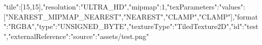 {"tile":[15,15],"resolution":"ULTRA_HD","mipmap":1,"texParameters":{"values":["NEAREST_MIPMAP_NEAREST","NEAREST","CLAMP","CLAMP"]},"format":"RGBA","type":"UNSIGNED_BYTE","textureType":"TiledTexture2D","id":"test","externalReference":{"source":"assets/test.png"}}